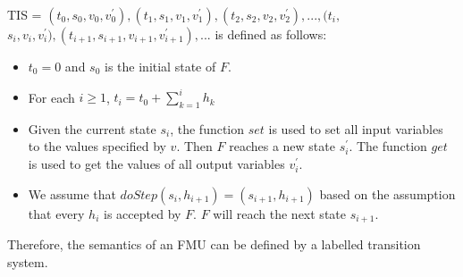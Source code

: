 TIS = $(t_{0},s_{0},v_{0},v_{0}^{\prime}), (t_{1},s_{1},v_{1},v_{1}^{\prime}),(t_{2},s_{2},v_{2},v_{2}^{\prime}), ..., (t_{i},$
$s_{i},v_{i},v_{i}^{\prime}), (t_{i+1},s_{i+1},v_{i+1},v_{i+1}^{\prime}), ...$ is
defined as follows:
\begin{itemize}
\item
$t_{0} = 0$ and $s_{0}$ is the initial state of $F$.
\item
For each $i \geqslant 1$, $t_{i} = t_{0} + \sum_{k = 1}^i h_{k}$
\item
Given the current state $s_{i}$, the function $set$ is used to set all input variables to the values specified by $v$. Then $F$ reaches a new state $s_{i}^{\prime}$. The function $get$ is used to get the values of all output variables $v_{i}^{\prime}$.
\item 
We assume that $doStep(s_{i}, h_{i+1}) = (s_{i+1},h_{i+1})$ based on the assumption that every $h_{i}$ is accepted by $F$. $F$ will reach the next state $s_{i+1}$.
\end{itemize}
Therefore, the semantics of an FMU can be defined by a labelled transition system.
